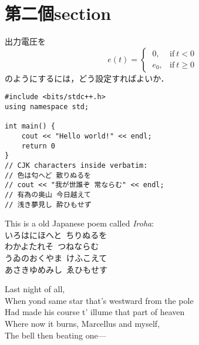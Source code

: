 \section{第二個section}

\begin{tcolorbox}[colback=myteal!5!white,colframe=myteal!75!black,title=\textsf{課題2}]
	出力電圧を
	\begin{equation*}
		e(t) =
		\begin{cases}
			\ 0,   & \text{if}\ t < 0   \\
			\ e_0, & \text{if}\ t \ge 0
		\end{cases}
	\end{equation*}
	のようにするには，どう設定すればよいか．
\end{tcolorbox}

\begin{verbatim}
#include <bits/stdc++.h>
using namespace std;

int main() {
	cout << "Hello world!" << endl;
	return 0
}
// CJK characters inside verbatim:
// 色は匂へど 散りぬるを
// cout << "我が世誰ぞ 常ならむ" << endl;
// 有為の奥山 今日越えて
// 浅き夢見し 酔ひもせず

\end{verbatim}

This is a old Japanese poem called \emph{Iroha}: \\
いろはにほへと\ ちりぬるを \\
わかよたれそ\ つねならむ \\
うゐのおくやま\ けふこえて \\
あさきゆめみし\ ゑひもせす

Last night of all, \\
When yond same star that's westward from the pole \\
Had made his course t' illume that part of heaven \\
Where now it burns, Marcellus and myself, \\
The bell then beating one—
